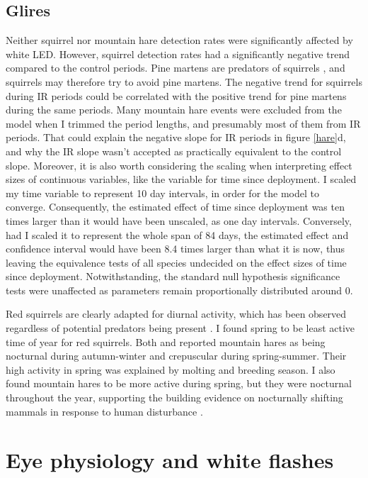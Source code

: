 \subsection{Glires}

Neither squirrel nor mountain hare detection rates were significantly affected by white LED.
However, squirrel detection rates had a significantly negative trend compared to the control periods. Pine martens are predators of squirrels \autocite{Zalewski2000}, and squirrels may therefore try to avoid pine martens. The negative trend for squirrels during IR periods could be correlated with the positive trend for pine martens during the same periods. 
Many mountain hare events were excluded from the model when I trimmed the period lengths, and presumably most of them from IR periods. That could explain the negative slope for IR periods in figure \ref{hare}d, and why the IR slope wasn't accepted as practically equivalent to the control slope.
Moreover, it is also worth considering the scaling when interpreting effect sizes of continuous variables, like the variable for time since deployment. 
I scaled my time variable to represent 10 day intervals, in order for the model to converge. Consequently, the estimated effect of time since deployment was ten times larger than it would have been unscaled, as one day intervals.
Conversely, had I scaled it to represent the whole span of 84 days, the estimated effect and confidence interval would have been 8.4 times larger than what it is now, thus leaving the equivalence tests of all species undecided on the effect sizes of time since deployment.
Notwithstanding, the standard null hypothesis significance tests were unaffected as parameters remain proportionally distributed around 0. %

Red squirrels are clearly adapted for diurnal activity, which has been observed regardless of potential predators being present \autocite{Ikeda2016}. I found spring to be least active time of year for red squirrels.
Both \textcite{Ikeda2016} and \textcite{Ogurtsov2018} reported mountain hares as being nocturnal during autumn-winter and crepuscular during spring-summer. Their high activity in spring was explained by molting and breeding season.
I also found mountain hares to be more active during spring, but they were nocturnal throughout the year, supporting the building evidence on nocturnally shifting mammals in response to human disturbance \autocite{Gaynor2018}. 

\section{Eye physiology and white flashes}


